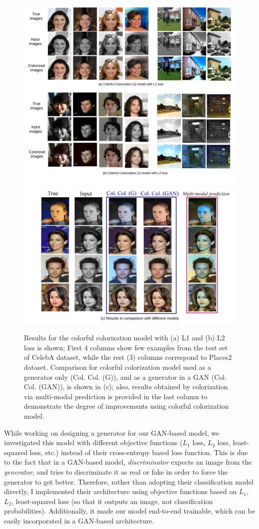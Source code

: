 \documentclass[10pt]{article}
\begin{document}
\begin{figure}[!h]
\centering
\includegraphics[width=0.8 \linewidth]{Figs/4.pdf} 
\includegraphics[width=0.7 \linewidth]{Figs/82.pdf}
\vspace{-1mm}
\caption{Results for the colorful colorization model \cite{zhang2016colorful} with (a) L1 and (b) L2 loss is shown; First $4$ columns show few examples from the test set of CelebA \cite{celebA} dataset, while the rest ($3$) columns correspond to Places2 \cite{places2} dataset. Comparison for colorful colorization model used as a generator only (Col. Col. (G)), and as a generator in a GAN (Col. Col. (GAN)), is shown in (c); also, results obtained by colorization via multi-modal prediction \cite{charpiat2008automatic} is provided in the last column to demonstrate the degree of improvements using colorful colorization model.}
\label{fig:res_full}
\end{figure}  


While working on designing a generator for our GAN-based model, we investigated this model with different objective functions ($L_1$ loss, $L_2$ loss, least-squared loss, etc.) instead of their cross-entropy based loss function. This is due to the fact that in a GAN-based model, \textit{discriminator} expects an image from the \textit{generator}, 
and tries to discriminate it as real or fake in order to force the generator to get better.  
Therefore, rather than adopting their classification model directly, I implemented their architecture 
using objective functions based on $L_1$, $L_2$, least-squared loss (so that it outputs an image, not classification probabilities). Additionally, it made our model end-to-end trainable, which can be easily incorporated in a GAN-based architecture. 
\end{document}
